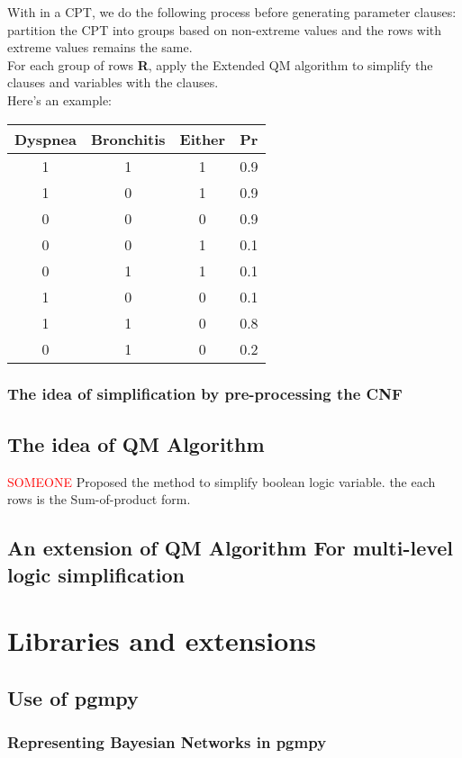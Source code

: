 With in a CPT, we do the following process before generating parameter clauses:\\
partition the CPT into groups based on non-extreme values and the rows with extreme values remains the same.\\
For each group of rows \textbf{R}, apply the Extended QM algorithm to simplify the clauses and variables with the clauses.\\
Here's an example:
\begin{tabular}{c c c c}
    \hline
    Dyspnea & Bronchitis & Either & Pr\\
    \hline
    \hline
    1 & 1 & 1 & 0.9 \\
    1 & 0 & 1 & 0.9 \\
    0 & 0 & 0 & 0.9 \\
    0 & 0 & 1 & 0.1 \\
    0 & 1 & 1 & 0.1 \\
    1 & 0 & 0 & 0.1 \\
    1 & 1 & 0 & 0.8 \\
    0 & 1 & 0 & 0.2 \\
    \hline
\end{tabular}


\subsubsection{The idea of simplification by pre-processing the CNF}

\subsection{The idea of QM Algorithm}
\textcolor{red}{SOMEONE} Proposed the method to simplify boolean logic variable. the each rows is the Sum-of-product form.
\subsection{An extension of QM Algorithm For multi-level logic simplification}



\section{Libraries and extensions}
\subsection{Use of \textbf{pgmpy}}
\subsubsection{Representing Bayesian Networks in pgmpy}
